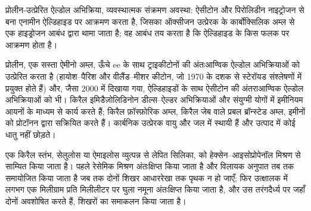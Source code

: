 \begin{omfigure}

{\small प्रोलीन-उत्प्रेरित ऐल्डोल अभिक्रिया, व्यवस्थात्मक संक्रमण अवस्था:
ऐसीटोन और पिरोलिडीन नाइट्रोजन से बना एनामीन ऐल्डिहाइड पर आक्रमण करता है,
जिसका ऑक्सीजन उत्प्रेरक के कार्बोक्सिलिक अम्ल से एक हाइड्रोजन आबंध द्वारा थामा जाता है;
वह आबंध तय करता है कि ऐल्डिहाइड के किस फलक पर आक्रमण होता है।}
\end{omfigure}

प्रोलीन, एक सस्ता ऐमीनो अम्ल, ऊँचे ee के साथ ट्राइकीटोनों की अंतःआण्विक ऐल्डोल अभिक्रियाओं को
उत्प्रेरित करता है (हायोश--पैरिश और वीलैंड--मीशर कीटोन, जो
1970 के दशक से स्टेरॉयड संश्लेषणों में प्रयुक्त होते हैं) और, जैसा 2000 में दिखाया गया, ऐल्डिहाइडों के साथ
ऐसीटोन की अंतराआण्विक ऐल्डोल अभिक्रियाओं को भी। किरैल इमिडैज़ोलिडिनोन
डील्स--ऐल्डर अभिक्रियाओं और संयुग्मी योगों में इमीनियम आयनों के माध्यम से कार्य करते हैं; किरैल
फ़ॉस्फ़ोरिक अम्ल, किरैल जेब वाले प्रबल ब्रॉन्स्टेड अम्ल, इमीनों को
प्रोटॉनन द्वारा सक्रियित करते हैं। कार्बनिक उत्प्रेरक वायु और जल में स्थायी हैं और उत्पाद में कोई धातु
नहीं छोड़ते।

\begin{inthelab}[एक किरैल HPLC विश्लेषण]
एक किरैल स्तंभ, सेलुलोस या ऐमाइलोस व्युत्पन्न से लेपित सिलिका, को
हेक्सेन--आइसोप्रोपेनॉल मिश्रण से साम्यित किया जाता है। पहले रेसेमिक मिश्रण अंतःक्षिप्त किया जाता है
और विलायक अनुपात तब तक समायोजित किया जाता है जब तक दोनों शिखर आधाररेखा तक पृथक न हो जाएँ; फिर
उत्क्षालक में लगभग एक मिलीग्राम प्रति मिलीलीटर पर घुला नमूना
अंतःक्षिप्त किया जाता है, और उस तरंगदैर्ध्य पर जहाँ दोनों अवशोषित करते हैं, शिखरों का समाकलन किया जाता है।
\end{inthelab}

